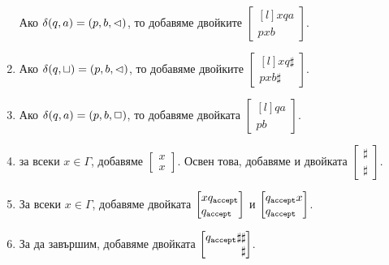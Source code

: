 \begin{hint}
\begin{enumerate}[1)]
    Ако $\delta(q,a) = (p,b,\lhd)$, то добавяме двойките
    $\begin{bmatrix*}[l] xqa\\ pxb\end{bmatrix*}$.
  \item
    Ако $\delta(q,\sqcup) = (p,b,\lhd)$, то добавяме двойките
    $\begin{bmatrix*}[l] xq\sharp\\ pxb\sharp\end{bmatrix*}$.
  \item
    Ако $\delta(q,a) = (p,b,\Box)$, то добавяме двойката
    $\begin{bmatrix*}[l] qa\\ pb\end{bmatrix*}$.
  \item
    за всеки $x \in \Gamma$, добавяме $\begin{bmatrix} x\\ x\end{bmatrix}$.
    Освен това, добавяме и двойката $\begin{bmatrix} \sharp\\ \sharp\end{bmatrix}$.
  \item
    За всеки $x \in \Gamma$, добавяме двойката
    $\begin{bmatrix*}[l] x\qaccept\\ \qaccept\end{bmatrix*}$ и $\begin{bmatrix*}[l] \qaccept x\\ \qaccept\end{bmatrix*}$.
  \item
    За да завършим, добавяме двойката
    $\begin{bmatrix*}[r] \qaccept\sharp\sharp\\ \sharp\end{bmatrix*}$.
  \end{enumerate}
\end{hint}

